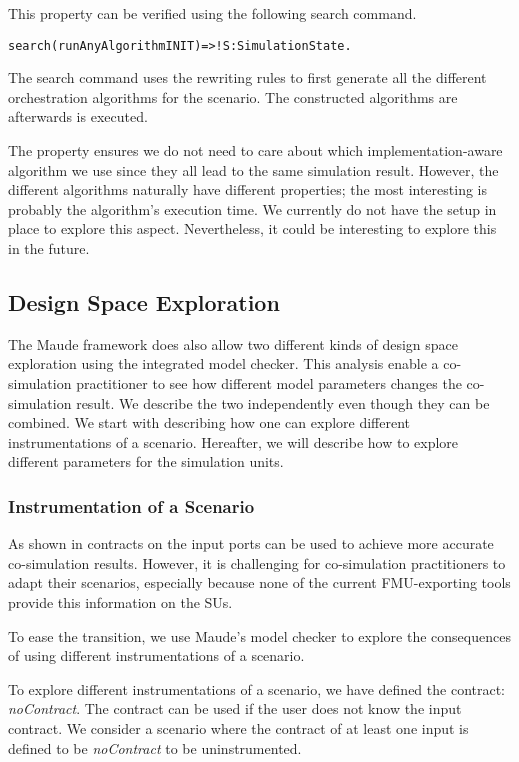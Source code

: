 This property can be verified using the following search command.

\begin{alltt}
  search (runAnyAlgorithm INIT)  =>! S:SimulationState . 
\end{alltt}
The search command uses the rewriting rules to first generate all the different orchestration algorithms for the scenario.
The constructed algorithms are afterwards is executed.

The property ensures we do not need to care about which implementation-aware algorithm we use since they all lead to the same simulation result.
However, the different algorithms naturally have different properties; the most interesting is probably the algorithm's execution time. 
We currently do not have the setup in place to explore this aspect.
Nevertheless, it could be interesting to explore this in the future.


\subsection{Design Space Exploration}
The Maude framework does also allow two different kinds of design space exploration using the integrated model checker.
This analysis enable a co-simulation practitioner to see how different model parameters changes the co-simulation result.
We describe the two independently even though they can be combined.
We start with describing how one can explore different instrumentations of a scenario.
Hereafter, we will describe how to explore different parameters for the simulation units.  

\subsubsection{Instrumentation of a Scenario}
As shown in \cite{Gomes2019,Oakes2021,hansen_verification_2021} contracts on the input ports can be used to achieve more accurate co-simulation results.
However, it is challenging for co-simulation practitioners to adapt their scenarios, especially because none of the current FMU-exporting tools provide this information on the SUs.

To ease the transition, we use Maude's model checker to explore the consequences of using different instrumentations of a scenario.

To explore different instrumentations of a scenario, we have defined the contract: \textit{noContract}.
The contract can be used if the user does not know the input contract.
We consider a scenario where the contract of at least one input is defined to be \textit{noContract} to be uninstrumented.


